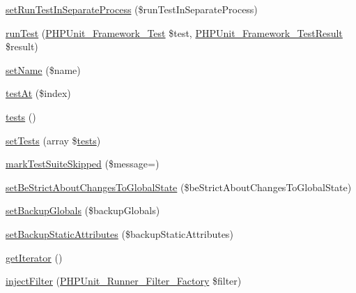 \begin{DoxyCompactItemize}
\item 
\mbox{\hyperlink{class_p_h_p_unit___framework___test_suite_a0cef8c0001d1beb9c775897699ea4f54}{set\+Run\+Test\+In\+Separate\+Process}} (\$run\+Test\+In\+Separate\+Process)
\item 
\mbox{\hyperlink{class_p_h_p_unit___framework___test_suite_ab3aa10e3edecc8f2b4175a3215f36b51}{run\+Test}} (\mbox{\hyperlink{interface_p_h_p_unit___framework___test}{P\+H\+P\+Unit\+\_\+\+Framework\+\_\+\+Test}} \$test, \mbox{\hyperlink{class_p_h_p_unit___framework___test_result}{P\+H\+P\+Unit\+\_\+\+Framework\+\_\+\+Test\+Result}} \$result)
\item 
\mbox{\hyperlink{class_p_h_p_unit___framework___test_suite_a2fe666694997d047711d7653eca2f132}{set\+Name}} (\$name)
\item 
\mbox{\hyperlink{class_p_h_p_unit___framework___test_suite_a3dbe00f62c56c9a1d37021fcec078bc2}{test\+At}} (\$index)
\item 
\mbox{\hyperlink{class_p_h_p_unit___framework___test_suite_a4f7cb59970abda717113cc0e51d0b71b}{tests}} ()
\item 
\mbox{\hyperlink{class_p_h_p_unit___framework___test_suite_a1607846b217222c6cdb30a847bdd0379}{set\+Tests}} (array \$\mbox{\hyperlink{class_p_h_p_unit___framework___test_suite_a4f7cb59970abda717113cc0e51d0b71b}{tests}})
\item 
\mbox{\hyperlink{class_p_h_p_unit___framework___test_suite_a7fb169484b885710ac6f3b1efc64d046}{mark\+Test\+Suite\+Skipped}} (\$message=\textquotesingle{}\textquotesingle{})
\item 
\mbox{\hyperlink{class_p_h_p_unit___framework___test_suite_a60888e4ba273ecf8276a846a15a7b183}{set\+Be\+Strict\+About\+Changes\+To\+Global\+State}} (\$be\+Strict\+About\+Changes\+To\+Global\+State)
\item 
\mbox{\hyperlink{class_p_h_p_unit___framework___test_suite_a05198848657e1a00f153eb72b586d6be}{set\+Backup\+Globals}} (\$backup\+Globals)
\item 
\mbox{\hyperlink{class_p_h_p_unit___framework___test_suite_a7f2ed8943e4b0713c34c9b6e3cf2bea8}{set\+Backup\+Static\+Attributes}} (\$backup\+Static\+Attributes)
\item 
\mbox{\hyperlink{class_p_h_p_unit___framework___test_suite_a7a9f937c2958e6f4dd7b030f86fb70b7}{get\+Iterator}} ()
\item 
\mbox{\hyperlink{class_p_h_p_unit___framework___test_suite_a6bf30b910cb9caead065cb57d9bac99a}{inject\+Filter}} (\mbox{\hyperlink{class_p_h_p_unit___runner___filter___factory}{P\+H\+P\+Unit\+\_\+\+Runner\+\_\+\+Filter\+\_\+\+Factory}} \$filter)
\end{DoxyCompactItemize}
